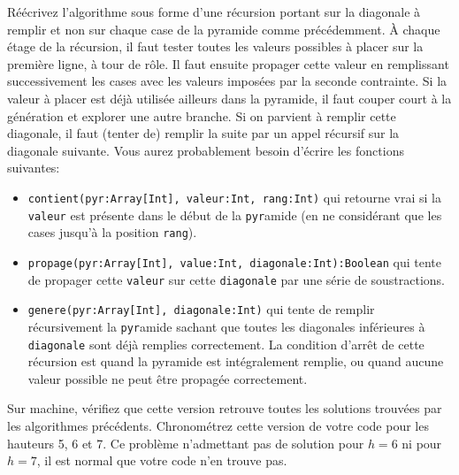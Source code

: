 \documentclass[10pt]{article}\usepackage[nu]{esial}
\begin{document}
\Question %
Réécrivez l'algorithme sous forme d'une récursion portant sur la diagonale à
remplir et non sur chaque case de la pyramide comme précédemment. À chaque étage
de la récursion, il faut tester toutes les valeurs possibles à placer sur la
première ligne, à tour de rôle. Il faut ensuite propager cette valeur en
remplissant successivement les cases avec les valeurs imposées par la seconde
contrainte. Si la valeur à placer est déjà utilisée ailleurs dans la pyramide,
il faut couper court à la génération et explorer une autre branche. Si on
parvient à remplir cette diagonale, il faut (tenter de) remplir la suite par un
appel récursif sur la diagonale suivante. Vous aurez probablement besoin
d'écrire les fonctions suivantes:
\begin{itemize}
\item \texttt{contient(pyr:Array[Int], valeur:Int, rang:Int)} qui retourne vrai
  si la \texttt{valeur} est présente dans le début de la \texttt{pyr}amide
  (en ne considérant que les cases jusqu'à la position \texttt{rang}).
\item \texttt{propage(pyr:Array[Int], value:Int, diagonale:Int):Boolean} qui
  tente de propager cette \texttt{valeur} sur cette \texttt{diagonale} par une
  série de soustractions.
\item \texttt{genere(pyr:Array[Int], diagonale:Int)} qui tente de remplir
  récursivement la \texttt{pyr}amide sachant que toutes les diagonales
  inférieures à \texttt{diagonale} sont déjà remplies correctement. La condition
  d'arrêt de cette récursion est quand la pyramide est intégralement remplie, ou
  quand aucune valeur possible ne peut être propagée correctement.
\end{itemize}

\Question %
Sur machine, vérifiez que cette version retrouve toutes les solutions trouvées
par les algorithmes précédents. Chronométrez cette version de votre code pour
les hauteurs 5, 6 et 7. Ce problème n'admettant pas de solution pour $h=6$ ni
pour $h=7$, il est normal que votre code n'en trouve pas.
\end{document}
